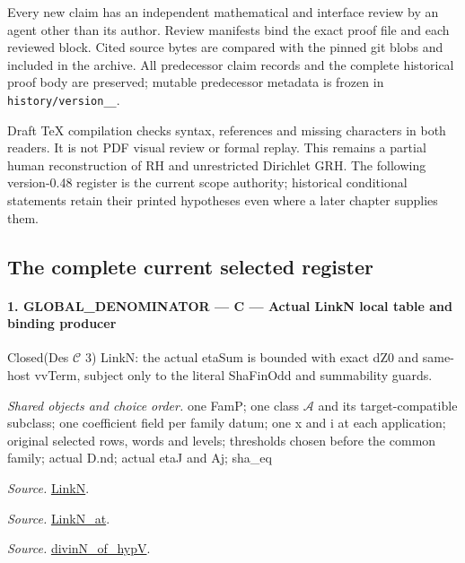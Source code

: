 Every new claim has an independent mathematical and interface review
by an agent other than its author. Review manifests bind the exact
proof file and each reviewed block. Cited source bytes are compared
with the pinned git blobs and included in the archive. All predecessor
claim records and the complete historical proof body are preserved;
mutable predecessor metadata is frozen in
\texttt{history/\allowbreak version\_\_}.

Draft TeX compilation checks syntax, references and missing characters
in both readers. It is not PDF visual review or formal replay.
This remains a partial human reconstruction of RH and unrestricted
Dirichlet GRH. The following version-0.48 register is the current
scope authority; historical conditional statements retain their
printed hypotheses even where a later chapter supplies them.

\subsection{The complete current selected register}

\paragraph{1. GLOBAL\_\allowbreak DENOMINATOR — C — Actual LinkN local table and binding producer}

Closed(Des $\mathcal C$ 3) LinkN: the actual etaSum is bounded with exact dZ0 and same-host vvTerm, subject only to the literal ShaFinOdd and summability guards.

\emph{Shared objects and choice order.} one FamP; one class $\mathcal A$ and its target-compatible subclass; one coefficient field per family datum; one x and i at each application; original selected rows, words and levels; thresholds chosen before the common family; actual D.nd; actual etaJ and Aj; sha\_\allowbreak eq

\emph{Source.} \href{https://github.com/CocoSgt/riemann-hypothesis-lean/blob/7cbf7a0c32fca1badf05931879a37c3f8a2b03b4/src/Formalism/SharpRestriction/GlobalTheoremInputs.lean#L45-L48}{LinkN}.

\emph{Source.} \href{https://github.com/CocoSgt/riemann-hypothesis-lean/blob/7cbf7a0c32fca1badf05931879a37c3f8a2b03b4/src/Formalism/SharpRestriction/GlobalTheoremInputs.lean#L40-L44}{LinkN\_\allowbreak at}.

\emph{Source.} \href{https://github.com/CocoSgt/riemann-hypothesis-lean/blob/7cbf7a0c32fca1badf05931879a37c3f8a2b03b4/src/Development/AutomorphicArithmetic/CharacterBoxes/DivinNOfHypV.lean#L117-L134}{divinN\_\allowbreak of\_\allowbreak hypV}.



